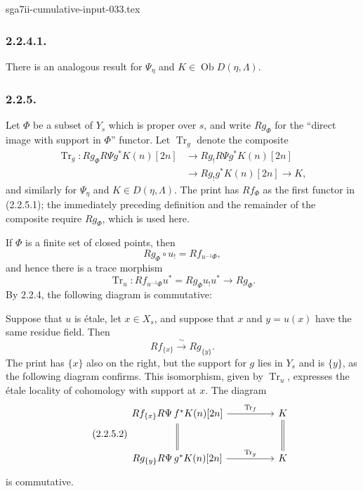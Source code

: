 \begin{filecontents*}{sga7ii-cumulative-input-033.tex}
\subsubsection*{2.2.4.1.}
There is an analogous result for $\Psi_\eta$ and
$K\in\operatorname{Ob}D(\eta,\Lambda)$.

\subsubsection*{2.2.5.}
Let $\Phi$ be a subset of $Y_s$ which is proper over $s$, and write
$Rg_\Phi$ for the ``direct image with support in $\Phi$'' functor.
Let $\operatorname{Tr}_g$ denote the composite
\begin{equation}\tag{2.2.5.1}
\begin{split}
\operatorname{Tr}_g:
Rg_\Phi R\Psi g^*K(n)[2n]
&\longrightarrow Rg_!R\Psi g^*K(n)[2n] \\
&\longrightarrow Rg_!g^*K(n)[2n]
\longrightarrow K,
\end{split}
\end{equation}
and similarly for $\Psi_\eta$ and $K\in D(\eta,\Lambda)$.  The print
has $Rf_\Phi$ as the first functor in (2.2.5.1); the immediately
preceding definition and the remainder of the composite require
$Rg_\Phi$, which is used here.

If $\Phi$ is a finite set of closed points, then
\[
Rg_\Phi\circ u_!=Rf_{u^{-1}\Phi},
\]
and hence there is a trace morphism
\[
\operatorname{Tr}_u:
Rf_{u^{-1}\Phi}u^*=Rg_\Phi u_!u^*\longrightarrow Rg_\Phi.
\]
By 2.2.4, the following diagram is commutative:
\begin{center}
\end{center}

Suppose that $u$ is \'{e}tale, let $x\in X_s$, and suppose that $x$
and $y=u(x)$ have the same residue field.  Then
\[
Rf_{\{x\}}\xrightarrow{\ \sim\ }Rg_{\{y\}}.
\]
The print has $\{x\}$ also on the right, but the support for $g$ lies
in $Y_s$ and is $\{y\}$, as the following diagram confirms.  This
isomorphism, given by $\operatorname{Tr}_u$, expresses the \'{e}tale
locality of cohomology with support at $x$.  The diagram
\begin{equation}\tag{2.2.5.2}
\begin{tikzcd}[column sep=huge, row sep=large]
Rf_{\{x\}}R\Psi\,f^*K(n)[2n]
  \arrow[r, "\operatorname{Tr}_f"] \arrow[d, equal]
  & K \arrow[d, equal] \\
Rg_{\{y\}}R\Psi\,g^*K(n)[2n]
  \arrow[r, "\operatorname{Tr}_g"]
  & K
\end{tikzcd}
\end{equation}
is commutative.


\end{filecontents*}

